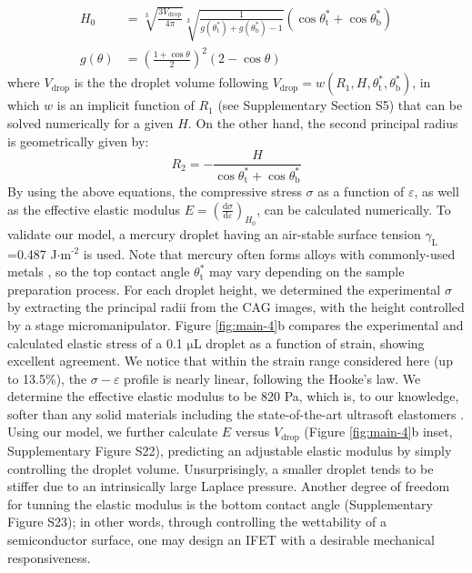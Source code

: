 \documentclass[journal=nalefd,manuscript=letter,email=true,hyperref=true,keywords=true]{achemso}
\begin{document}
  \begin{equation}
  \label{eq:H0}
  \begin{aligned}
    H_{0} &= \sqrt[3]{\frac{3 V_{\mathrm{drop}}}{4 \pi}} \sqrt[3]{\frac{1}{ 
   g(\theta_{\mathrm{t}}^{*}) + g(\theta_{\mathrm{b}}^{*}) -1 }}  \left(\cos \theta_{\mathrm{t}}^{*} + \cos \theta_{\mathrm{b}}^{*
}\right) \\
    g(\theta) &= \left(\frac{1 + \cos \theta}{2} \right)^{2} \left(2 - \cos \theta \right)
  \end{aligned}
  \end{equation}
where \(V_{\mathrm{drop}}\) is the the droplet volume following
\(V_{\mathrm{drop}} = w(R_{1}, H, \theta_{\mathrm{t}}^{*},
  \theta_{\mathrm{b}}^{*})\), in which \(w\) is an implicit function of
\(R_{1}\) (see Supplementary Section S5) that can be solved
numerically for a given \(H\). On the other hand, the second principal
radius is geometrically given by:
\begin{equation}
\label{eq:1}
R_{2} = -\frac{H}{\cos \theta_{\mathrm{t}}^{*} + \cos \theta_{\mathrm{b}}^{*}}
\end{equation}
By using the above equations, the compressive stress \(\sigma\)
as a function of \(\varepsilon\), as well as the effective elastic modulus
\(E = \left({\displaystyle \frac{\mathrm{d} \sigma}{\mathrm{d}
  \varepsilon}}\right)_{H_{0}}\), can be calculated numerically. To validate
our model, a mercury droplet having an air-stable surface tension
\(\gamma_{\mathrm{L}}\)=0.487 J\(\cdot\)m\(^{\text{-2}}\) is used. Note that
mercury often forms alloys with commonly-used metals
\cite{Kieffer_1959}, so the top contact angle
\(\theta_{\mathrm{t}}^{*}\) may vary depending on the sample
preparation process. For each droplet height, we determined the
experimental \(\sigma\) by extracting the principal radii from
the CAG images, with the height controlled by a stage
micromanipulator. Figure \ref{fig:main-4}b compares the experimental and
calculated elastic stress of a 0.1 \(\mathrm{\mu}\)L droplet as a
function of strain, showing excellent agreement. We notice that
within the strain range considered here (up to 13.5\%), the
\(\sigma - \varepsilon\) profile is nearly linear, following the
Hooke's law. We determine the effective elastic modulus to be 820
Pa, which is, to our knowledge, softer than any solid materials
including the state-of-the-art ultrasoft elastomers
\cite{Miriyev_2017,Jang_2015}. Using our model, we further calculate
\(E\) versus \(V_{\mathrm{drop}}\) (Figure \ref{fig:main-4}b inset, Supplementary Figure S22),
predicting an adjustable elastic modulus by simply controlling the
droplet volume. Unsurprisingly, a smaller droplet tends to be
stiffer due to an intrinsically large Laplace pressure. Another
degree of freedom for tunning the elastic modulus is the bottom
contact angle (Supplementary Figure S23); in other words, through
controlling the wettability of a semiconductor surface, one may
design an IFET with a desirable mechanical responsiveness.
\end{document}
